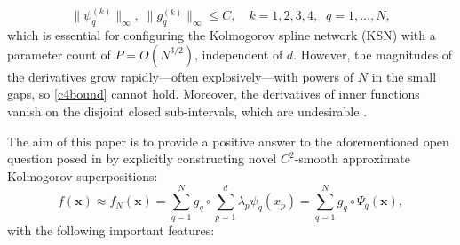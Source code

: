 \documentclass[10pt,reqno,final]{amsart}
\theoremstyle{remark}
\theoremstyle{definition}
\newcommand{\bs}[1]{\boldsymbol{#1}}
\newcommand{\wll}[1]{#1}
\begin{document}
\begin{equation}\label{c4bound}
    \|\psi_q^{(k)}\|_\infty,\; \|g_q^{(k)}\|_\infty \le C,\quad k=1,2,3,4, \;\; q=1,\ldots, N,
\end{equation}
which is essential for configuring the Kolmogorov spline network (KSN) with a parameter count of \( P = O(N^{3/2})\), \wll{independent of $d$.}   
However, the magnitudes of the derivatives grow rapidly—often explosively—with powers of \( N \) in the small gaps, so \eqref{c4bound} cannot hold. Moreover, the derivatives of inner functions vanish on the disjoint closed sub-intervals, which are undesirable \cite{Demb2021note}.  

The aim of this paper is to provide a \wll{positive} answer to the aforementioned open question posed in \cite{Demb2021note} by
 explicitly constructing  novel  $C^2$-smooth approximate  Kolmogorov superpositions: 
\begin{equation}\label{fx-KA-form00}
    f(\bs x)\approx  f_N(\bs x)=\sum_{q=1}^{N} g_q\circ \sum_{p=1}^d \lambda_p \psi_q(x_p)= \sum_{q=1}^{N} g_q\circ \Psi_q(\bs x),
\end{equation}
\noindent with the following important features: 
\end{document}
